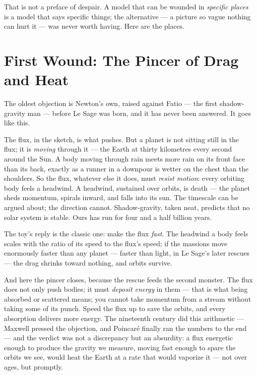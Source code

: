 \documentclass[fontsize=11pt,paper=a4,pagesize=auto,parskip=half-]{scrbook}
\begin{document}
That is not a preface of despair. A model that can be wounded in \emph{specific places} is a model that says specific things; the alternative --- a picture so vague nothing can hurt it --- was never worth having. Here are the places.

\section{First Wound: The Pincer of Drag and Heat}

The oldest objection is Newton's own, raised against Fatio --- the first shadow-gravity man --- before Le Sage was born, and it has never been answered. It goes like this.

The flux, in the sketch, is what pushes. But a planet is not sitting still in the flux; it is \emph{moving} through it --- the Earth at thirty kilometres every second around the Sun. A body moving through rain meets more rain on its front face than its back, exactly as a runner in a downpour is wetter on the chest than the shoulders. So the flux, whatever else it does, must \emph{resist motion}: every orbiting body feels a headwind. A headwind, sustained over orbits, is death --- the planet sheds momentum, spirals inward, and falls into its sun. The timescale can be argued about; the direction cannot. Shadow-gravity, taken neat, predicts that no solar system is stable. Ours has run for four and a half billion years.

The toy's reply is the classic one: make the flux \emph{fast}. The headwind a body feels scales with the ratio of its speed to the flux's speed; if the massions move enormously faster than any planet --- faster than light, in Le Sage's later rescues --- the drag shrinks toward nothing, and orbits survive.

And here the pincer closes, because the rescue feeds the second monster. The flux does not only push bodies; it must \emph{deposit energy} in them --- that is what being absorbed or scattered means; you cannot take momentum from a stream without taking some of its punch. Speed the flux up to save the orbits, and every absorption delivers more energy. The nineteenth century did this arithmetic --- Maxwell pressed the objection, and Poincaré finally ran the numbers to the end --- and the verdict was not a discrepancy but an absurdity: a flux energetic enough to produce the gravity we measure, moving fast enough to spare the orbits we see, would heat the Earth at a rate that would vaporize it --- not over ages, but promptly.
\end{document}
